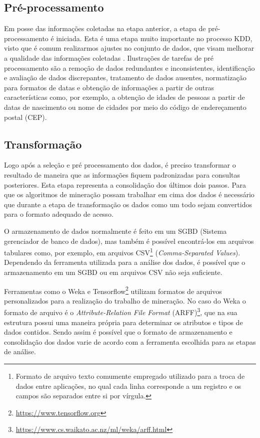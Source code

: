 \subsection{Pré-processamento}

Em posse das informações coletadas na etapa anterior, a etapa de  pré-processamento é iniciada. Esta é uma etapa muito importante no processo KDD, visto que é comum realizarmos ajustes no conjunto de dados, que visam melhorar a qualidade das informações coletadas \cite{Aggarwal2015}. Ilustrações de tarefas de pré processamento são a remoção de dados redundantes e inconsistentes, identificação e avaliação de dados discrepantes, tratamento de dados ausentes, normatização para formatos de datas e obtenção de informações a partir de outras características como, por exemplo, a obtenção de idades de pessoas a partir de datas de nascimento ou nome de cidades por meio do código de endereçamento postal (CEP).

\subsection{Transformação}

Logo após a seleção e pré processamento dos dados, é preciso transformar o resultado de maneira que as informações fiquem padronizadas para consultas posteriores. Esta etapa representa a consolidação dos últimos dois passos. Para que os algoritmos de mineração possam trabalhar em cima dos dados é necessário que durante a etapa de transformação os dados como um todo sejam convertidos para o formato adequado de acesso.

O armazenamento de dados normalmente é feito em um SGBD (Sistema gerenciador de banco de dados), mas também é possível encontrá-los  em arquivos tabulares como, por exemplo, em arquivos CSV\footnote{Formato de arquivo texto comumente empregado utilizado para a troca de dados entre aplicações, no qual cada linha corresponde a um registro e os campos são separados entre si por vírgula.} (\emph{Comma-Separated Values}). Dependendo da ferramenta utilizada para a análise dos dados, é possível que o armazenamento em um SGBD ou em arquivos CSV não seja suficiente.

Ferramentas como o Weka \cite{Hall2009} e Tensorflow\footnote{\url{https://www.tensorflow.org}} utilizam formatos de arquivos personalizados para a realização do trabalho de mineração. No caso do Weka o formato de arquivo é o \emph{Attribute-Relation File Format} (ARFF)\footnote{\url{https://www.cs.waikato.ac.nz/ml/weka/arff.html}}, que na sua estrutura possui uma maneira própria para determinar os atributos e tipos de dados contidos. Sendo assim é possível que o formato de armazenamento e consolidação dos dados varie de acordo com a ferramenta escolhida para as etapas de análise.


